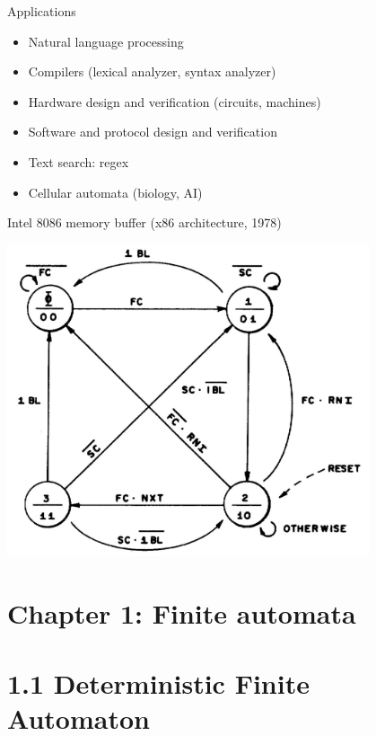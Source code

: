 \documentclass[handout]{beamer}
\begin{document}
\begin{frame}{Applications}

    \begin{itemize}
        \item Natural language processing
        \item Compilers (lexical analyzer, syntax analyzer) 
        \item Hardware design and verification (circuits, machines)
        \item Software and protocol design and verification
        \item Text search: regex
        \item Cellular automata (biology, AI)
    \end{itemize}

\end{frame}


\begin{frame}{Intel 8086 memory buffer (x86 architecture, 1978)}

    \begin{center}
        \includegraphics[width=0.8\textwidth]{files/8086.jpg}	
    \end{center}

\end{frame}


\section{\sc Chapter 1: Finite automata}


\section{1.1 Deterministic Finite Automaton}
\end{document}
